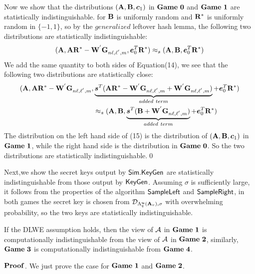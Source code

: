 Now we show that the distributions $(\mathbf{A}, \mathbf{B},\boldsymbol{c}_{1})$ in $\mathbf{Game\ 0}$ and $\mat{Game\ 1}$ are statistically indistinguishable. for $\mathbf{B}$ is uniformly random and $\mathbf{R}^{*}$ is uniformly random in $\{-1,1\}$, so by the $generalized$ leftover hash lemma, the following two distributions are statistically indistinguishable:
\begin{equation}
(\mathbf{A},\mathbf{A}\mathbf{R}^{*}-\mathbf{W}^{'}\mathbf{G}_{n\ell , \ell^{'},m}, \boldsymbol{e}^{T}_{0}\mathbf{R}^{*})\approx_{s}(\mathbf{A,B},\boldsymbol{e}^{T}_{0}\mathbf{R}^{*})
\end{equation}
We add the same quantity to both sides of Equation(14), we see that the following two distributions are statistically close:
\begin{equation}
\begin{split}
(\mathbf{A},\mathbf{A}\mathbf{R}^{*}-\mathbf{W}^{'}\mathbf{G}_{n\ell , \ell^{'},m},& \underbrace{\boldsymbol{s}^{T}(\mathbf{A}\mathbf{R}^{*}-\mathbf{W}^{'}\mathbf{G}_{n\ell , \ell^{'},m}+\mathbf{W}^{'}\mathbf{G}_{n\ell , \ell^{'},m})}
_{added\ term}+\boldsymbol{e}^{T}_{0}\mathbf{R}^{*})\\
&\approx_{s}(\mathbf{A,B},\underbrace{\boldsymbol{s}^{T}(\mathbf{B}+\mathbf{W}^{'}\mathbf{G}_{n\ell , \ell^{'},m})}_{added\ term}+\boldsymbol{e}^{T}_{0}\mathbf{R}^{*})\\
\end{split}
\end{equation}
The distribution on the left hand side of (15) is the distribution of $(\mathbf{A,B},\boldsymbol{c}_{1})$ in $\mat{Game\ 1}$, while the right hand side is the distribution in $\mathbf{Game\ 0}$. So the two distributions are statistically indistinguishable.\qed %

Next,we show the secret keys output by $\mathsf{Sim}.\mathsf{KeyGen}$ are statistically indistinguishable from those output by $\mathsf{KeyGen}$. Assuming $\sigma$ is sufficiently large, it follows from the properties of the algorithm $\mathsf{SampleLeft}$ and $\mathsf{SampleRight}$,  in both games the secret key is chosen from $\mathcal{D}_{\Lambda^{\boldsymbol{u}}_{q}(\mathbf{A}_{v}),\sigma}$ with overwhelming probability, so the two keys are statistically indistinguishable.
\begin{lemma}
If the DLWE assumption holds, then the view of $\mathcal{A}$ in $\mat{Game\ 1}$ is computationally indistinguishable from the view of $\mathcal{A}$ in $\mat{Game\ 2}$, similarly, $\mathbf{Game\ 3}$ is computationally indistinguishable from $\mathbf{Game\ 4}$.
\end{lemma}
\noindent $\mathbf{Proof}$. We just prove the case for $\mat{Game\ 1}$ and $\mat{Game\ 2}$.\

